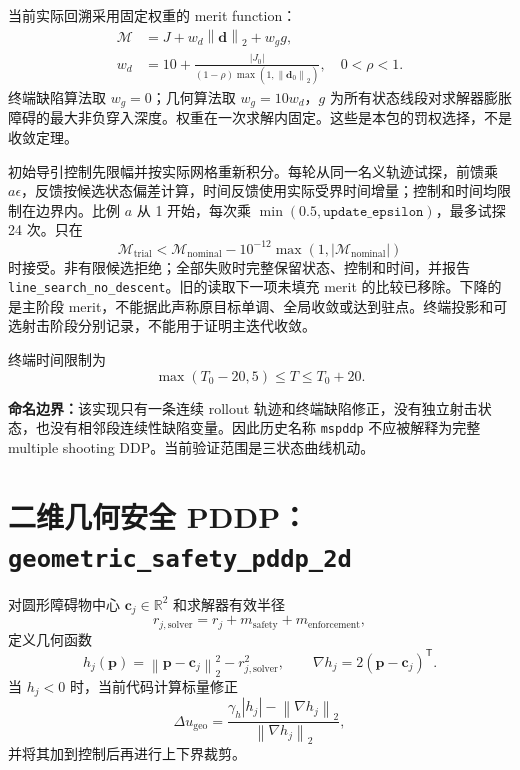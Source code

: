 \documentclass[UTF8,zihao=-4,openany,fontset=fandol]{ctexbook}
\newcommand{\code}[1]{\nolinkurl{#1}}
\newcommand{\R}{\mathbb{R}}
\newcommand{\normtwo}[1]{\left\lVert #1\right\rVert_2}
\newcommand{\important}[1]{%
  \begin{center}
  \colorbox{ddlight}{\parbox{0.91\textwidth}{#1}}
  \end{center}}
\begin{document}
当前实际回溯采用固定权重的 merit function：
\begin{align}
 \mathcal M&=J+w_d\normtwo{\bm d}+w_g g,\\
 w_d&=10+\frac{|J_0|}{(1-\rho)\max(1,\normtwo{\bm d_0})},\quad 0<\rho<1.
\end{align}
终端缺陷算法取 $w_g=0$；几何算法取 $w_g=10w_d$，$g$ 为所有状态线段对求解器膨胀障碍的最大非负穿入深度。权重在一次求解内固定。这些是本包的罚权选择，不是收敛定理。

初始导引控制先限幅并按实际网格重新积分。每轮从同一名义轨迹试探，前馈乘 $a\epsilon$，反馈按候选状态偏差计算，时间反馈使用实际受界时间增量；控制和时间均限制在边界内。比例 $a$ 从 1 开始，每次乘 $\min(0.5,\texttt{update\_epsilon})$，最多试探 24 次。只在
\[
 \mathcal M_{\mathrm{trial}}<\mathcal M_{\mathrm{nominal}}
 -10^{-12}\max(1,|\mathcal M_{\mathrm{nominal}}|)
\]
时接受。非有限候选拒绝；全部失败时完整保留状态、控制和时间，并报告 \code{line_search_no_descent}。旧的读取下一项未填充 merit 的比较已移除。下降的是主阶段 merit，不能据此声称原目标单调、全局收敛或达到驻点。终端投影和可选射击阶段分别记录，不能用于证明主迭代收敛。

终端时间限制为
\[
  \max(T_0-20,5)\le T\le T_0+20.
\]

\important{\textbf{命名边界：}该实现只有一条连续 rollout 轨迹和终端缺陷修正，没有独立射击状态，也没有相邻段连续性缺陷变量。因此历史名称 \code{mspddp} 不应被解释为完整 multiple shooting DDP。当前验证范围是三状态曲线机动。}

\section{二维几何安全 PDDP：\texorpdfstring{\texttt{geometric\_safety\_pddp\_2d}}{geometric-safety-pddp-2d}}

对圆形障碍物中心 $\bm{c}_j\in\R^2$ 和求解器有效半径
\begin{equation}
  r_{j,\mathrm{solver}}
  =
  r_j+m_{\mathrm{safety}}+m_{\mathrm{enforcement}},
\end{equation}
定义几何函数
\begin{equation}
  h_j(\bm{p})
  =
  \normtwo{\bm{p}-\bm{c}_j}^2-r_{j,\mathrm{solver}}^2,
  \qquad
  \nabla h_j=2(\bm{p}-\bm{c}_j)^\mathsf{T}.
\end{equation}
当 $h_j<0$ 时，当前代码计算标量修正
\begin{equation}
  \Delta u_{\mathrm{geo}}
  =
  \frac{\gamma_h|h_j|-\normtwo{\nabla h_j}}
       {\normtwo{\nabla h_j}},
  \label{eq:geocorrection}
\end{equation}
并将其加到控制后再进行上下界裁剪。
\end{document}
